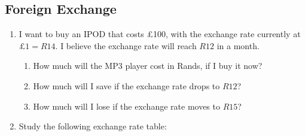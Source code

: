             \subsection{ Foreign Exchange }
            \nopagebreak
            \label{m39335*id68624}\begin{enumerate}[noitemsep, label=\textbf{\arabic*}. ] 
            \label{m39335*uid21}\item I want to buy an IPOD that costs £100, with the exchange rate currently at
\begin{math}£1=R14\end{math}. I believe the exchange rate will reach \begin{math}R12\end{math} in a month.
\label{m39335*id68677}\begin{enumerate}[noitemsep, label=\textbf{\alph*}. ] 
            \label{m39335*uid22}\item How much will the MP3 player cost in Rands, if I buy it now?
\label{m39335*uid23}\item How much will I save if the exchange rate drops to \begin{math}R12\end{math}?
\label{m39335*uid24}\item How much will I lose if the exchange rate moves to \begin{math}R15\end{math}?
\end{enumerate}
        
        \label{m39335*uid25}\item Study the following exchange rate table:

    
      

\end{enumerate}
